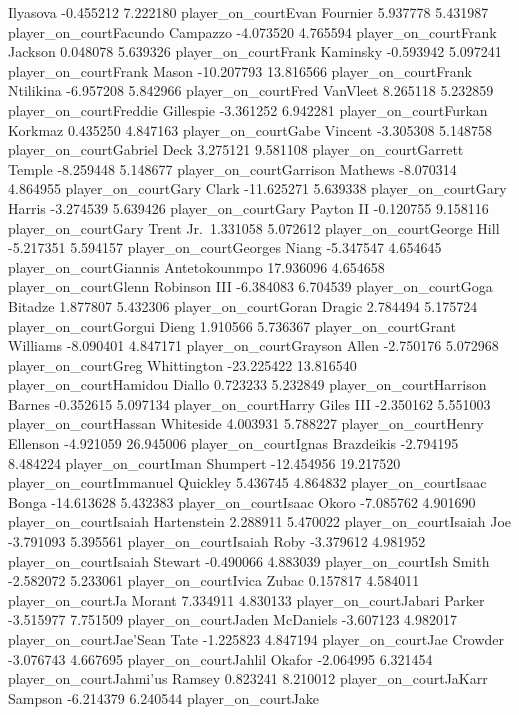 \documentclass[
  landscape]{article}
\begin{document}
Ilyasova -0.455212 7.222180 player\_on\_courtEvan Fournier 5.937778
5.431987 player\_on\_courtFacundo Campazzo -4.073520 4.765594
player\_on\_courtFrank Jackson 0.048078 5.639326 player\_on\_courtFrank
Kaminsky -0.593942 5.097241 player\_on\_courtFrank Mason -10.207793
13.816566 player\_on\_courtFrank Ntilikina -6.957208 5.842966
player\_on\_courtFred VanVleet 8.265118 5.232859
player\_on\_courtFreddie Gillespie -3.361252 6.942281
player\_on\_courtFurkan Korkmaz 0.435250 4.847163 player\_on\_courtGabe
Vincent -3.305308 5.148758 player\_on\_courtGabriel Deck 3.275121
9.581108 player\_on\_courtGarrett Temple -8.259448 5.148677
player\_on\_courtGarrison Mathews -8.070314 4.864955
player\_on\_courtGary Clark -11.625271 5.639338 player\_on\_courtGary
Harris -3.274539 5.639426 player\_on\_courtGary Payton II -0.120755
9.158116 player\_on\_courtGary Trent Jr.~1.331058 5.072612
player\_on\_courtGeorge Hill -5.217351 5.594157 player\_on\_courtGeorges
Niang -5.347547 4.654645 player\_on\_courtGiannis Antetokounmpo
17.936096 4.654658 player\_on\_courtGlenn Robinson III -6.384083
6.704539 player\_on\_courtGoga Bitadze 1.877807 5.432306
player\_on\_courtGoran Dragic 2.784494 5.175724 player\_on\_courtGorgui
Dieng 1.910566 5.736367 player\_on\_courtGrant Williams -8.090401
4.847171 player\_on\_courtGrayson Allen -2.750176 5.072968
player\_on\_courtGreg Whittington -23.225422 13.816540
player\_on\_courtHamidou Diallo 0.723233 5.232849
player\_on\_courtHarrison Barnes -0.352615 5.097134
player\_on\_courtHarry Giles III -2.350162 5.551003
player\_on\_courtHassan Whiteside 4.003931 5.788227
player\_on\_courtHenry Ellenson -4.921059 26.945006
player\_on\_courtIgnas Brazdeikis -2.794195 8.484224
player\_on\_courtIman Shumpert -12.454956 19.217520
player\_on\_courtImmanuel Quickley 5.436745 4.864832
player\_on\_courtIsaac Bonga -14.613628 5.432383 player\_on\_courtIsaac
Okoro -7.085762 4.901690 player\_on\_courtIsaiah Hartenstein 2.288911
5.470022 player\_on\_courtIsaiah Joe -3.791093 5.395561
player\_on\_courtIsaiah Roby -3.379612 4.981952 player\_on\_courtIsaiah
Stewart -0.490066 4.883039 player\_on\_courtIsh Smith -2.582072 5.233061
player\_on\_courtIvica Zubac 0.157817 4.584011 player\_on\_courtJa
Morant 7.334911 4.830133 player\_on\_courtJabari Parker -3.515977
7.751509 player\_on\_courtJaden McDaniels -3.607123 4.982017
player\_on\_courtJae'Sean Tate -1.225823 4.847194 player\_on\_courtJae
Crowder -3.076743 4.667695 player\_on\_courtJahlil Okafor -2.064995
6.321454 player\_on\_courtJahmi'us Ramsey 0.823241 8.210012
player\_on\_courtJaKarr Sampson -6.214379 6.240544 player\_on\_courtJake
\end{document}
